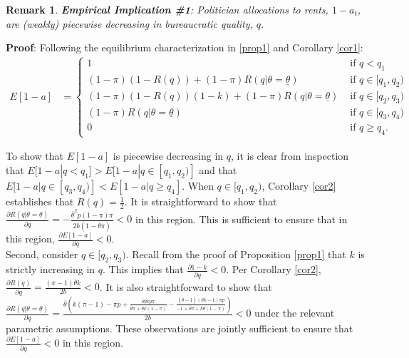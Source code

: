 \documentclass[11pt,english]{article}
\newtheorem{remark}{Remark}
\begin{document}
\begin{remark}\label{rem:ei1}
\textbf{Empirical Implication \#1}: Politician allocations to rents, $1-a_t$, are (weakly) piecewise decreasing in bureaucratic quality, $q$.
\end{remark}

\textbf{Proof}: Following the equilibrium characterization in \ref{prop1} and Corollary \ref{cor1}: 
\begin{align}
E[1-a] &=\begin{cases}
1 & \text{ if } q < q_1\\
(1-\pi)(1-R(q)) + (1-\pi)R(q|\theta = \underline{\theta}) & \text{ if }  q \in [q_1, q_2)\\
(1-\pi)(1-R(q))(1-k) + (1-\pi)R(q|\theta = \underline{\theta}) & \text{ if } q \in [q_2, q_3) \\
(1-\pi)R(q|\theta = \underline{\theta})  & \text{ if } q \in [q_3, q_4)\\
0 & \text{ if } q\geq q_4. 
\end{cases}
\end{align}

To show that $E[1-a]$ is piecewise decreasing in $q$, it is clear from inspection that $E[1-a|q< q_1]> E[1-a|q \in [q_1, q_2)]$ and that $E[1-a|q\in [q_3, q_4)]< E[1-a|q \geq q_4]$. When $q\in [q_1, q_2)$, Corollary \ref{cor2} establishes that $R(q) = \frac{1}{2}$. It is straightforward to show that $\frac{\partial R(q|\theta = \underline{\theta})}{\partial q} = -\frac{\overline{\theta}^2 p (1-\pi)\pi}{2b(1-\overline{\theta}\pi)} < 0$ in this region. This is sufficient to ensure that in this region, $\frac{\partial E[1-a]}{\partial q}<0$. \\

Second, consider $q\in[q_2, q_3)$. Recall from the proof of Proposition \ref{prop1} that $k$ is strictly increasing in $q$. This implies that $\frac{\partial 1-k}{\partial q} < 0$. Per Corollary \ref{cor2}, $\frac{\partial R(q)}{\partial q}=\frac{(\pi-1)\overline{\theta}k}{2b}<0$. It is also straightforward to show that $\frac{\partial R(q|\theta = \underline{\theta})}{\partial q} = \frac{\overline{\theta}(k(\pi-1)-\pi p + \frac{\overline{\theta}\underline{\theta}k p \pi}{\overline{\theta}\pi + \underline{\theta}k (1-\pi)}-\frac{(\overline{\theta}-1)(\underline{\theta}k-1)\pi p}{-1 + \overline{\theta}\pi + k \underline{\theta}(1-\pi)})}{2b}<0$ under the relevant parametric assumptions. These observations are jointly sufficient to ensure that  $\frac{\partial E[1-a]}{\partial q}<0$ in this region.\\
\end{document}
